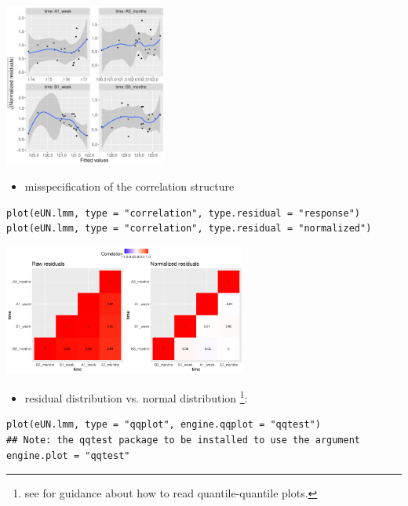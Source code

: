 \documentclass[12pt]{article}
\begin{document}
\begin{center}
\includegraphics[width=0.4\textwidth]{./figures/diag-scatterplot2.pdf}
\end{center}

\clearpage

\begin{itemize}
\item misspecification of the correlation structure
\end{itemize}

\lstset{language=r,label= ,caption= ,captionpos=b,numbers=none}
\begin{lstlisting}
plot(eUN.lmm, type = "correlation", type.residual = "response")
plot(eUN.lmm, type = "correlation", type.residual = "normalized")
\end{lstlisting}

\begin{center}
\includegraphics[width=0.6\textwidth]{./figures/diag-correlation.pdf}
\end{center}

\begin{itemize}
\item residual distribution vs. normal distribution \footnote{see \cite{oldford2016self} for guidance
about how to read quantile-quantile plots.}:
\end{itemize}
\lstset{language=r,label= ,caption= ,captionpos=b,numbers=none}
\begin{lstlisting}
plot(eUN.lmm, type = "qqplot", engine.qqplot = "qqtest")
## Note: the qqtest package to be installed to use the argument engine.plot = "qqtest" 
\end{lstlisting}
\end{document}
